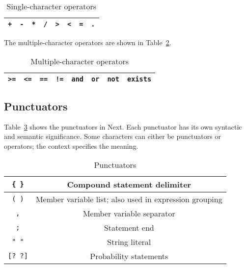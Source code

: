\documentclass[12pt]{article}
\begin{document}
\begin{table}[htdp]
\caption{Single-character operators}
\begin{center}
\begin{tabular}{|c|c|c|c|c|c|c|c|}
\hline
\texttt{+} & \texttt{-} & \texttt{*} & \texttt{/}  & \texttt{>} & \texttt{<} & \texttt{=} & \texttt{.}  \\
\hline
\end{tabular}
\end{center}
\label{single_operators}
\end{table}%


\noindent The multiple-character operators are shown in Table~\ref{multi_operators}.

\begin{table}[htdp]
\caption{Multiple-character operators}
\begin{center}
\begin{tabular}{|c|c|c|c|c|c|c|c|}
\hline
\texttt{>=} & \texttt{<=} & \texttt{==} & \texttt{!=} & \texttt{and} & \texttt{or} & \texttt{not} & \texttt{exists}\\
\hline
\end{tabular}
\end{center}
\label{multi_operators}
\end{table}%

\subsection{Punctuators}
Table~\ref{punctuators} shows the punctuators in Next.  Each punctuator has its own syntactic and semantic significance.  Some characters can either be punctuators or operators; the context specifies the meaning.

\begin{table}[htdp]
\caption{Punctuators}
\begin{center}
\begin{tabular}{|c|c|}
\hline
\texttt{\{ \}} & Compound statement delimiter \\
\hline
\texttt{( )} & Member variable list; also used in expression grouping \\
\hline
\texttt{,} & Member variable separator \\
\hline
\texttt{;} & Statement end \\
\hline 
\texttt{" "} & String literal \\
\hline
\texttt{[? ?]} & Probability statements \\ 
\hline
\end{tabular}
\end{center}
\label{punctuators}
\end{table}%
\end{document}
